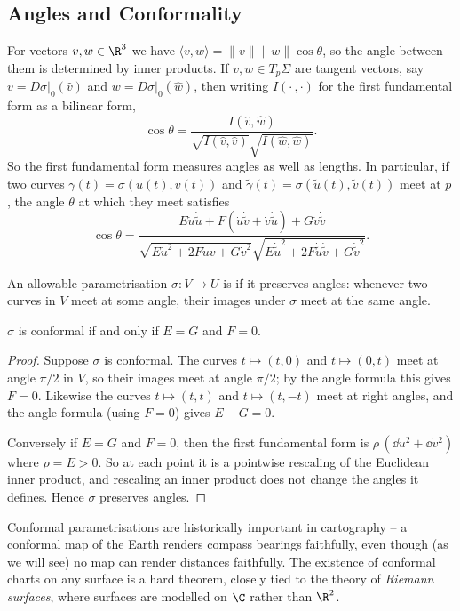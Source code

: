\subsection{Angles and Conformality}

For vectors $v, w \in \R^3$ we have $\langle v, w \rangle = \|v\| \|w\| \cos\theta$, so the angle between them is determined by inner products. If $v, w \in T_p \Sigma$ are tangent vectors, say $v = D\sigma|_0(\hat{v})$ and $w = D\sigma|_0(\hat{w})$, then writing $I(\cdot\, , \cdot)$ for the first fundamental form as a bilinear form,
$$
\cos \theta = \frac{I(\hat v, \hat w)}{\sqrt{I(\hat v, \hat v)}\sqrt{I(\hat w, \hat w)}}.
$$
So the first fundamental form measures angles as well as lengths. In particular, if two curves $\gamma(t) = \sigma(u(t), v(t))$ and $\tilde{\gamma}(t) = \sigma(\tilde{u}(t), \tilde v(t))$ meet at $p$, the angle $\theta$ at which they meet satisfies
$$
\cos\theta = \frac{E \dot u \dot{\tilde u} + F (\dot u \dot{\tilde v} + \dot v \dot{\tilde u}) + G \dot v \dot{\tilde v}}{\sqrt{E \dot u^2 + 2F \dot u \dot v + G \dot v^2}\sqrt{E \dot{\tilde u}^2 + 2F \dot{\tilde u}\dot{\tilde v} + G \dot{\tilde v}^2}}.
$$

\begin{definition}[Conformal]
    An allowable parametrisation $\sigma: V \rightarrow U$ is  if it preserves angles: whenever two curves in $V$ meet at some angle, their images under $\sigma$ meet at the same angle.
\end{definition}

\begin{lemma}
    $\sigma$ is conformal if and only if $E = G$ and $F = 0$.
\end{lemma}
\begin{proof}
    Suppose $\sigma$ is conformal. The curves $t \mapsto (t, 0)$ and $t \mapsto (0, t)$ meet at angle $\pi/2$ in $V$, so their images meet at angle $\pi/2$; by the angle formula this gives $F = 0$. Likewise the curves $t \mapsto (t, t)$ and $t \mapsto (t, -t)$ meet at right angles, and the angle formula (using $F = 0$) gives $E - G = 0$.

    Conversely if $E = G$ and $F = 0$, then the first fundamental form is $\rho\,(\dd u^2 + \dd v^2)$ where $\rho = E > 0$. So at each point it is a pointwise rescaling of the Euclidean inner product, and rescaling an inner product does not change the angles it defines. Hence $\sigma$ preserves angles.
\end{proof}

\begin{remark}
    Conformal parametrisations are historically important in cartography -- a conformal map of the Earth renders compass bearings faithfully, even though (as we will see) no map can render distances faithfully. The existence of conformal charts on any surface is a hard theorem, closely tied to the theory of \emph{Riemann surfaces}, where surfaces are modelled on $\C$ rather than $\R^2$.
\end{remark}


